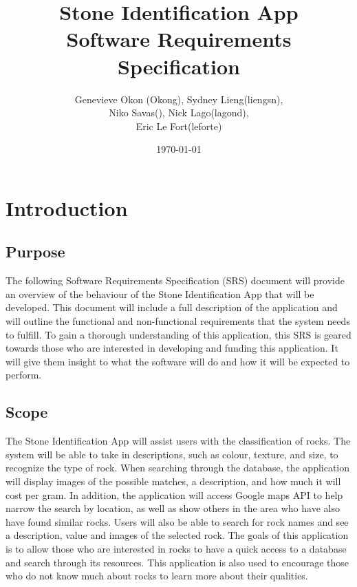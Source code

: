 \documentclass[titlepage]{article}
\begin{document}
	\title{Stone Identification App \\
		Software Requirements Specification}
	\author{Genevieve Okon (Okong), Sydney Lieng(liengsn),\\
		Niko Savas(), Nick Lago(lagond),\\
		Eric Le Fort(leforte)}
	\date{\today}
	\maketitle
	
\section{Introduction}
\subsection{Purpose}
The following Software Requirements Specification (SRS) document will provide an overview of the behaviour of the Stone Identification App that will be developed. This document will include a full description of the application and will outline the functional and non-functional requirements that the system needs to fulfill. To gain a thorough understanding of this application, this SRS is geared towards those who are interested in developing and funding this application. It will give them insight to what the software will do and how it will be expected to perform.
\subsection{Scope}
The Stone Identification App will assist users with the classification of rocks. The system will be able to take in descriptions, such as colour, texture, and size, to recognize the type of rock. When searching through the database, the application will display images of the possible matches, a description, and how much it will cost per gram. In addition, the application will access Google maps API to help narrow the search by location, as well as show others in the area who have also have found similar rocks. Users will also be able to search for rock names and see a description, value and images of the selected rock. The goals of this application is to allow those who are interested in rocks to have a quick access to a database and search through its resources. This application is also used to encourage those who do not know much about rocks to learn more about their qualities. 
\end{document}
